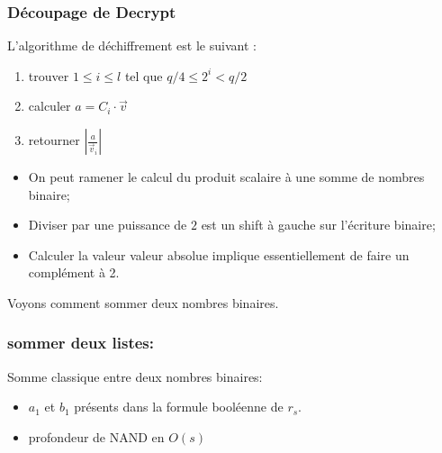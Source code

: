 \documentclass[10pt,xcolor={usenames,dvipsnames}]{beamer}
\begin{document}

\begin{frame}
\frametitle{Découpage de Decrypt}
L'algorithme de déchiffrement est le suivant :
\begin{enumerate}
\item trouver $1 \leqslant i \leqslant l$ tel que $q/4 \leqslant 2^i < q/2$
\item calculer $a = C_i \cdot \vec{v}$
\item retourner $|\frac{a}{\vec{v}_i}|$
\end{enumerate}

\begin{itemize}
\item On peut ramener le calcul du produit scalaire à une somme de nombres binaire;
\item Diviser par une puissance de $2$ est un shift à gauche sur l'écriture binaire;
\item Calculer la valeur valeur absolue implique essentiellement de faire un complément à 2.
\end{itemize}

Voyons comment sommer deux nombres binaires.

\end{frame} 


\begin{frame} 
\frametitle{sommer deux listes: }
Somme classique entre deux nombres binaires:
  \begin{figure}
    \begin{center}
      \begin{tikzpicture}[scale = 1.2, transform shape]
      	
      \end{tikzpicture}
    \end{center}
  \end{figure}
\begin{itemize}
\item $a_1$ et $b_1$ présents dans la formule booléenne de $r_s$.
\item profondeur de NAND en $O(s)$
\end{itemize}
\end{frame} 
    
\end{document}

